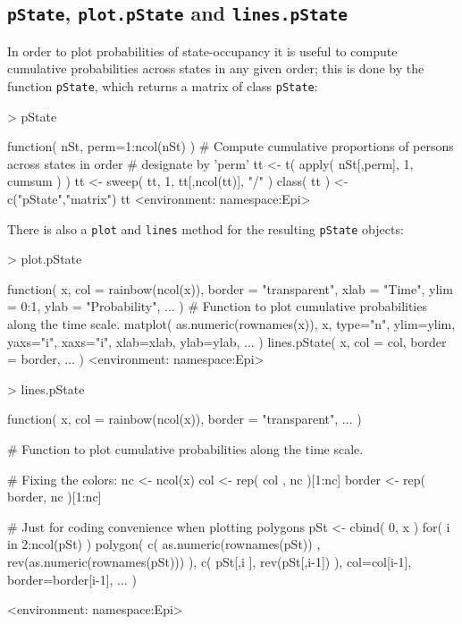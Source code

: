 \documentclass[a4paper,twoside,12pt]{report}
\begin{document}
\subsection{\texttt{pState}, \texttt{plot.pState} and \texttt{lines.pState}}

In order to plot probabilities of state-occupancy it is useful to
compute cumulative probabilities across states in any given order;
this is done by the function \texttt{pState}, which returns a matrix
of class \texttt{pState}:
\begin{Schunk}
\begin{Sinput}
> pState
\end{Sinput}
\begin{Soutput}
function( nSt, perm=1:ncol(nSt) )
{
# Compute cumulative proportions of persons across states in order
# designate by 'perm'
tt <- t( apply( nSt[,perm], 1, cumsum ) )
tt <- sweep( tt, 1, tt[,ncol(tt)], "/" )
class( tt ) <- c("pState","matrix")
tt
}
<environment: namespace:Epi>
\end{Soutput}
\end{Schunk}
There is also a \texttt{plot} and \texttt{lines} method for the
resulting \texttt{pState} objects:
\begin{Schunk}
\begin{Sinput}
> plot.pState
\end{Sinput}
\begin{Soutput}
function( x,
        col = rainbow(ncol(x)),
     border = "transparent",
       xlab = "Time",
       ylim = 0:1,
       ylab = "Probability", ... )
{
# Function to plot cumulative probabilities along the time scale.
matplot( as.numeric(rownames(x)), x, type="n",
         ylim=ylim, yaxs="i", xaxs="i",
         xlab=xlab, ylab=ylab, ... )
lines.pState( x,
        col = col,
     border = border, ... )
}
<environment: namespace:Epi>
\end{Soutput}
\begin{Sinput}
> lines.pState
\end{Sinput}
\begin{Soutput}
function( x,
        col = rainbow(ncol(x)),
     border = "transparent", ... )
{
# Function to plot cumulative probabilities along the time scale.

# Fixing the colors:
nc <- ncol(x)
col    <- rep( col   , nc )[1:nc]
border <- rep( border, nc )[1:nc]

# Just for coding convenience when plotting polygons
pSt <- cbind( 0, x )
for( i in 2:ncol(pSt) )
   {
   polygon( c(    as.numeric(rownames(pSt)) ,
              rev(as.numeric(rownames(pSt))) ),
            c(    pSt[,i  ],
              rev(pSt[,i-1]) ),
            col=col[i-1], border=border[i-1], ... )
   }
}
<environment: namespace:Epi>
\end{Soutput}
\end{Schunk}
\end{document}
